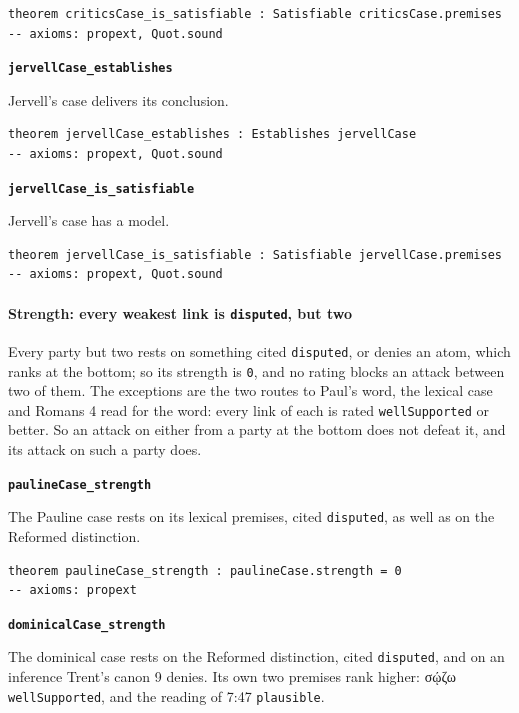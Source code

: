 \documentclass[11pt]{article}
\begin{document}
{\small\begin{verbatim}
theorem criticsCase_is_satisfiable : Satisfiable criticsCase.premises
-- axioms: propext, Quot.sound
\end{verbatim}}
\par\medskip\noindent\textbf{\texttt{jervell\allowbreak{}Case\_\allowbreak{}establishes}}\par\nobreak\noindent
Jervell's case delivers its conclusion.

{\small\begin{verbatim}
theorem jervellCase_establishes : Establishes jervellCase
-- axioms: propext, Quot.sound
\end{verbatim}}
\par\medskip\noindent\textbf{\texttt{jervell\allowbreak{}Case\_\allowbreak{}is\_\allowbreak{}satisfiable}}\par\nobreak\noindent
Jervell's case has a model.

{\small\begin{verbatim}
theorem jervellCase_is_satisfiable : Satisfiable jervellCase.premises
-- axioms: propext, Quot.sound
\end{verbatim}}
\paragraph*{Strength: every weakest link is \texttt{disputed}, but two}
\leavevmode\par
Every party but two rests on something cited \texttt{disputed}, or denies an atom, which ranks at the bottom; so its strength is \texttt{0}, and no rating blocks an attack between two of them. The exceptions are the two routes to Paul's word, the lexical case and Romans 4 read for the word: every link of each is rated \texttt{well\allowbreak{}Supported} or better. So an attack on either from a party at the bottom does not defeat it, and its attack on such a party does.

\par\medskip\noindent\textbf{\texttt{pauline\allowbreak{}Case\_\allowbreak{}strength}}\par\nobreak\noindent
The Pauline case rests on its lexical premises, cited \texttt{disputed}, as well as on the Reformed distinction.

{\small\begin{verbatim}
theorem paulineCase_strength : paulineCase.strength = 0
-- axioms: propext
\end{verbatim}}
\par\medskip\noindent\textbf{\texttt{dominical\allowbreak{}Case\_\allowbreak{}strength}}\par\nobreak\noindent
The dominical case rests on the Reformed distinction, cited \texttt{disputed}, and on an inference Trent's canon 9 denies. Its own two premises rank higher: σῴζω \texttt{well\allowbreak{}Supported}, and the reading of 7:47 \texttt{plausible}.
\end{document}
